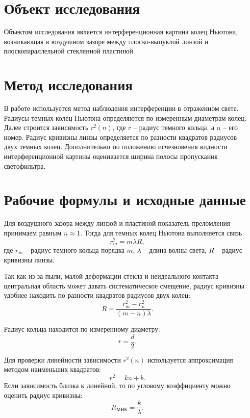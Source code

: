 \documentclass[12pt,a4paper]{article}
\begin{document}
\section{Объект исследования}

Объектом исследования является интерференционная картина колец Ньютона, возникающая в воздушном зазоре между плоско-выпуклой линзой и плоскопараллельной стеклянной пластиной.

\section{Метод исследования}

В работе используется метод наблюдения интерференции в отраженном свете. Радиусы темных колец Ньютона определяются по измеренным диаметрам колец. Далее строится зависимость $r^2(n)$, где $r$ -- радиус темного кольца, а $n$ -- его номер. Радиус кривизны линзы определяется по разности квадратов радиусов двух темных колец. Дополнительно по положению исчезновения видности интерференционной картины оценивается ширина полосы пропускания светофильтра.

\section{Рабочие формулы и исходные данные}

Для воздушного зазора между линзой и пластиной показатель преломления принимаем равным $n \approx 1$. Тогда для темных колец Ньютона выполняется связь
\begin{equation}
    r_m^2 = m\lambda R,
\end{equation}
где $r_m$ -- радиус темного кольца порядка $m$, $\lambda$ -- длина волны света, $R$ -- радиус кривизны линзы.

Так как из-за пыли, малой деформации стекла и неидеального контакта центральная область может давать систематическое смещение, радиус кривизны удобнее находить по разности квадратов радиусов двух колец:
\begin{equation}
    R = \frac{r_m^2-r_n^2}{(m-n)\lambda}.
\end{equation}

Радиус кольца находится по измеренному диаметру:
\begin{equation}
    r = \frac{d}{2}.
\end{equation}

Для проверки линейности зависимости $r^2(n)$ используется аппроксимация методом наименьших квадратов:
\begin{equation}
    r^2 = k n + b.
\end{equation}
Если зависимость близка к линейной, то по угловому коэффициенту можно оценить радиус кривизны:
\begin{equation}
    R_{\text{МНК}} = \frac{k}{\lambda}.
\end{equation}
\end{document}
